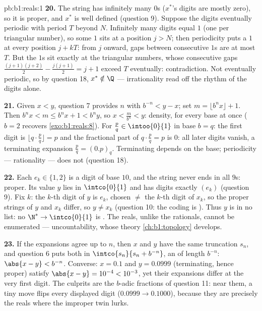 \begin{solution}{pb:b1:reals:1}
\textbf{20.} The string has infinitely many $0$s ($x^*$'s digits
are mostly zero), so it is proper, and $x^*$ is well defined
(question 9). Suppose the digits eventually periodic with period
$T$ beyond $N$. Infinitely many digits equal $1$ (one per
triangular number), so some $1$ sits at a position $j > N$; then
periodicity puts a $1$ at every position $j + kT$: from $j$
onward, gaps between consecutive $1$s are at most $T$. But the
$1$s sit exactly at the triangular numbers, whose consecutive
gaps $\frac{(j+1)(j+2)}{2} - \frac{j(j+1)}{2} = j + 1$ exceed $T$
eventually: contradiction. Not eventually periodic, so by
question 18, $x^* \notin \Q$ --- irrationality read off the
rhythm of the digits alone.

\textbf{21.} Given $x < y$, question 7 provides $n$ with $b^{-n}
< y - x$; set $m = \lfloor b^n x \rfloor + 1$. Then $b^n x < m
\leq b^n x + 1 < b^n y$, so $x < \frac{m}{b^n} < y$: density,
for every base at once ($b = 2$ recovers
\cref{exo:b1:reals:8}). For $\frac pq \in \intoo{0}{1}$ in base
$b = q$: the first digit is $\lfloor q \cdot \frac pq \rfloor =
p$ and the fractional part of $q \cdot \frac pq = p$ is $0$: all
later digits vanish, a terminating expansion $\frac pq =
(0.p)_q$. Terminating depends on the base; periodicity ---
rationality --- does not (question 18).

\textbf{22.} Each $e_k \in \{1, 2\}$ is a digit of base $10$, and
the string never ends in all $9$s: proper. Its value $y$ lies in
$\intco{0}{1}$ and has digits exactly $(e_k)$ (question 9). Fix
$k$: the $k$-th digit of $y$ is $e_k$, chosen $\neq$ the $k$-th
digit of $x_k$, so the proper strings of $y$ and $x_k$ differ, so
$y \neq x_k$ (question 10: the coding is ). Thus $y$ is
in no list: no  $\N^* \to \intco{0}{1}$ is . The
reals, unlike the rationals, cannot be enumerated ---
uncountability, whose theory \cref{ch:b1:topology} develops.

\textbf{23.} If the expansions agree up to $n$, then $x$ and $y$
have the same truncation $s_n$, and question 6 puts both in
$\intco{s_n}{s_n + b^{-n}}$, an  of length $b^{-n}$:
$\abs{x - y} < b^{-n}$. Converse: $x = 0.1$ and $y = 0.0999$
(terminating, hence proper) satisfy $\abs{x - y} = 10^{-4} <
10^{-3}$, yet their expansions differ at the very first digit.
The culprits are the $b$-adic fractions of question 11: near
them, a tiny move flips every displayed digit ($0.0999 \to
0.1000$), because they are precisely the reals where the
improper twin lurks.


\end{solution}
